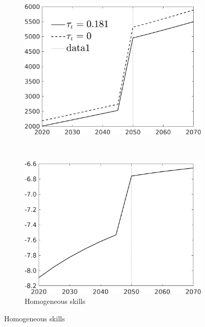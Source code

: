 \begin{figure}[h!!]
	\begin{subfigure}{0.7\textwidth}
		\caption{Homogeneous skills}
		\begin{minipage}[]{0.45\textwidth}
			\includegraphics[width=1\textwidth]{../../codding_model/own_basedOnFried/optimalPol_010922_revision/figures/all_13Sept22/CompTauf_bytaul_Reg5_Tauf_spillover0_nsk1_xgr0_knspil0_sep0_LFlimit1_emsbase0_countec0_GovRev0_etaa0.79_lgd1.png}
		\end{minipage}\begin{minipage}[]{0.05\textwidth}
		\
	\end{minipage}		
		\begin{minipage}[]{0.45\textwidth}
			\includegraphics[width=1\textwidth]{../../codding_model/own_basedOnFried/optimalPol_010922_revision/figures/all_13Sept22/CompTaufPER_bytaul_Reg5_Tauf_spillover0_nsk1_xgr0_knspil0_sep0_LFlimit1_emsbase0_countec0_GovRev0_etaa0.79_lgd0.png} 
		\end{minipage}	
	\end{subfigure}		
	

\end{figure}
